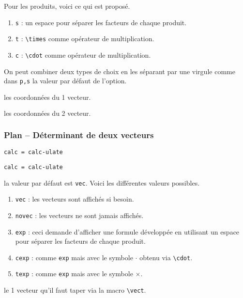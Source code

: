 \documentclass[12pt,a4paper]{article}
\newcommand\env[1]{\texttt{#1}}
\newcommand\macro[1]{\env{\textbackslash{}#1}}
\theoremstyle{definition}
\newcommand\mwhyprefix[2]{%
	\texttt{#1 = #1-#2}%
}
\newcommand\prefix[1]{%
	\texttt{#1}%
}
\begin{document}
            Pour les produits, voici ce qui est proposé.
\begin{enumerate}
	\item \prefix{s} : un espace pour séparer les facteurs de chaque produit.

	\item \prefix{t} : \macro{times} comme opérateur de multiplication.

	\item \prefix{c} : \macro{cdot} comme opérateur de multiplication.
\end{enumerate}

            On peut combiner deux types de choix en les séparant par une virgule comme dans \verb+p,s+ la valeur par défaut de l'option.


 les coordonnées du 1\ier{} vecteur.

 les coordonnées du 2\ieme{} vecteur.


\subsubsection{Plan -- Déterminant de deux vecteurs} \label{tnsgeo-colinearity-criteria}



 \hfill \mwhyprefix{calc}{ulate}

 \hfill \mwhyprefix{calc}{ulate}


\IDoption{} la valeur par défaut est \verb+vec+. Voici les différentes valeurs possibles.
\begin{enumerate}
	\item \verb+vec+ : les vecteurs sont affichés si besoin.

	\item \verb+novec+ : les vecteurs ne sont jamais affichés.

	\item \verb+exp+ : ceci demande d'afficher une formule développée en utilisant un espace pour séparer les facteurs de chaque produit.

	\item \verb+cexp+ : comme \verb+exp+ mais avec le symbole $\cdot$ obtenu via \macro{cdot}.

	\item \verb+texp+ : comme \verb+exp+ mais avec le symbole $\times$.
\end{enumerate}


 le 1\ier{} vecteur qu'il faut taper via la macro \macro{vect}.
\end{document}

